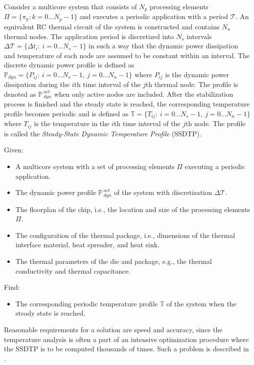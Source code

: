 Consider a multicore system that consists of $N_p$ processing elements $\Pi = \{ \pi_k: k = 0 \dots N_p - 1 \}$ and executes a periodic application with a period $\mathcal{T}$. An equivalent RC thermal circuit of the system is constructed and contains $N_n$ thermal nodes. The application period is discretized into $N_s$ intervals \mbox{$\Delta \mathcal{T} = \{ \Delta t_i: \: i = 0 \dots N_s - 1 \}$} in such a way that the dynamic power dissipation and temperature of each node are assumed to be constant within an interval. The discrete dynamic power profile is defined as \mbox{$\mathbb{P}_{dyn} = \{ P_{ij}: \: i = 0 \dots N_s - 1, \: j = 0 \dots N_n - 1 \}$} where $P_{ij}$ is the dynamic power dissipation during the $i$th time interval of the $j$th thermal node. The profile is denoted as $\mathbb{P}_{\: dyn}^{\:act}$ when only active nodes are included. After the stabilization process is finished and the steady state is reached, the corresponding temperature profile becomes periodic and is defined as \mbox{$\mathbb{T} = \{ T_{ij}: \: i = 0 \dots N_s - 1, \: j = 0 \dots N_n - 1 \}$} where $T_{ij}$ is the temperature in the $i$th time interval of the $j$th node. The profile is called the \emph{Steady-State Dynamic Temperature Profile} (SSDTP).

Given:
\begin{itemize}
  \item A multicore system with a set of processing elements $\Pi$ executing a periodic application.
  \item The dynamic power profile $\mathbb{P}_{\:dyn}^{\:act}$ of the system with discretization $\Delta \mathcal{T}$.
  \item The floorplan of the chip, i.e., the location and size of the processing elements $\Pi$.
  \item The configuration of the thermal package, i.e., dimensions of the thermal interface material, heat spreader, and heat sink.
  \item The thermal parameters of the die and package, e.g., the thermal conductivity and thermal capacitance.
\end{itemize}

Find:
\begin{itemize}
  \item The corresponding periodic temperature profile $\mathbb{T}$ of the system when the steady state is reached.
\end{itemize}

Reasonable requirements for a solution are speed and accuracy, since the temperature analysis is often a part of an intensive optimization procedure where the SSDTP is to be computed thousands of times. Such a problem is described in .
